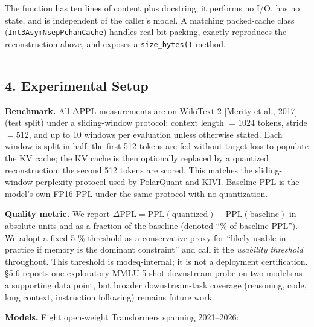 The function has ten lines of content plus docstring; it performs no
I/O, has no state, and is independent of the caller's model. A matching
packed-cache class (\texttt{Int3AsymNsepPchanCache}) handles real bit
packing, exactly reproduces the reconstruction above, and exposes a
\texttt{size\_bytes()} method.

\begin{center}\rule{0.5\linewidth}{0.5pt}\end{center}

\subsection{4. Experimental Setup}\label{experimental-setup}

\textbf{Benchmark.} All ΔPPL measurements are on WikiText-2 {[}Merity et
al., 2017{]} (test split) under a sliding-window protocol: context
length \(= 1024\) tokens, stride \(= 512\), and up to 10 windows per
evaluation unless otherwise stated. Each window is split in half: the
first 512 tokens are fed without target loss to populate the KV cache;
the KV cache is then optionally replaced by a quantized reconstruction;
the second 512 tokens are scored. This matches the sliding-window
perplexity protocol used by PolarQuant and KIVI. Baseline PPL is the
model's own FP16 PPL under the same protocol with no quantization.

\textbf{Quality metric.} We report
\(\Delta\mathrm{PPL} = \mathrm{PPL}(\text{quantized}) - \mathrm{PPL}(\text{baseline})\)
in absolute units and as a fraction of the baseline (denoted ``\% of
baseline PPL''). We adopt a fixed 5 \% threshold as a conservative proxy
for ``likely usable in practice if memory is the dominant constraint''
and call it the \emph{usability threshold} throughout. This threshold is
modeq-internal; it is not a deployment certification. §5.6 reports one
exploratory MMLU 5-shot downstream probe on two models as a supporting
data point, but broader downstream-task coverage (reasoning, code, long
context, instruction following) remains future work.

\textbf{Models.} Eight open-weight Transformers spanning 2021--2026:

